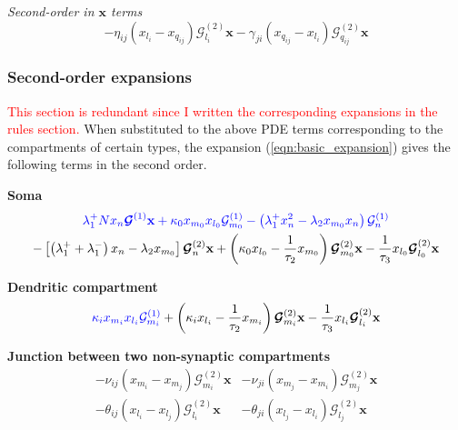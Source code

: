 \documentclass[a4paper, 11pt]{article}
\begin{document}
              
              {\it Second-order in $\mathbf x$ terms}
              \begin{equation*}
                -\eta_{ij}\left(x_{l_i}-x_{q_{ij}}\right)\boldsymbol{\mathcal G}^{(2)}_{l_i}\mathbf x - \gamma_{ji}\left(x_{q_{ij}}-x_{l_i}\right)\boldsymbol{\mathcal G}^{(2)}_{q_{ij}}\mathbf x
              \end{equation*}

              
              \subsubsection{Second-order expansions} \label{subsubsec:2nd_order_expansions}
              \textcolor{red}{This section is redundant since I written the corresponding expansions in the rules section.}
              When substituted to the above PDE terms corresponding to the compartments of certain types, the expansion (\ref{eqn:basic_expansion}) gives the following terms in the second order.
              
              {\bf Soma}
              \begin{multline*}
                \textcolor{blue}{\lambda_1^+Nx_n\boldsymbol{\mathcal G}^{(1)}\mathbf x + \kappa_0x_{m_0}x_{l_0}\mathcal G^{(1)}_{m_0} - \left(\lambda_1^+x_n^2-\lambda_2x_{m_0}x_n\right)\mathcal G_n^{(1)}}\\
                -\left[\left(\lambda_1^++\lambda_1^-\right)x_n-\lambda_2x_{m_0}\right]\boldsymbol{\mathcal G}_n^{(2)}\mathbf x + \left(\kappa_0x_{l_0}-\frac{1}{\tau_2}x_{m_0}\right)\boldsymbol{\mathcal G}_{m_0}^{(2)}\mathbf x - \frac{1}{\tau_3}x_{l_0}\boldsymbol{\mathcal G}^{(2)}_{l_0}\mathbf x
              \end{multline*}
              
              {\bf Dendritic compartment}
              \begin{equation*}
                \textcolor{blue}{\kappa_ix_{m_i}x_{l_i}\mathcal G^{(1)}_{m_i}} + \left(\kappa_ix_{l_i} - \frac{1}{\tau_2}x_{m_i}\right)\boldsymbol{\mathcal G}^{(2)}_{m_i}\mathbf x - \frac{1}{\tau_3}x_{l_i}\boldsymbol{\mathcal G}^{(2)}_{l_i}\mathbf x
              \end{equation*}

              {\bf Junction between two non-synaptic compartments}
              \begin{align*}
                -\nu_{ij}\left(x_{m_i} - x_{m_j}\right)\boldsymbol{\mathcal G}_{m_i}^{(2)}\mathbf x& - \nu_{ji}\left(x_{m_j} - x_{m_i}\right)\boldsymbol{\mathcal G}_{m_j}^{(2)}\mathbf x\\
                - \theta_{ij}\left(x_{l_i}-x_{l_j}\right)\boldsymbol{\mathcal G}_{l_i}^{(2)}\mathbf x& - \theta_{ji}\left(x_{l_j} - x_{l_i}\right)\boldsymbol{\mathcal G}^{(2)}_{l_j}\mathbf x
              \end{align*}
\end{document}
